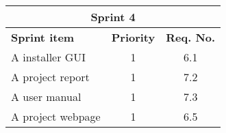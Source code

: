 \label{sprint4}
\begin{center}
	\begin{Large}
	\begin{tabular}{|p{10.5cm}|c|c|}
		\hline
		\multicolumn{3}{|c|}{\textbf{Sprint 4}} \\
		\hline
		\large{\textbf{Sprint item}} & \large{\textbf{Priority}} & \large{\textbf{Req. No.}} \\
		\hline
		\large{A installer GUI} & \large{1} & 6.1 \\
		\hline
		\large{A project report} & \large{1} & 7.2 \\
		\hline
		\large{A user manual} & \large{1} & 7.3 \\
		\hline
		\large{A project webpage} & \large{1} & 6.5 \\
		\hline
	\end{tabular}
	\end{Large}
\end{center}